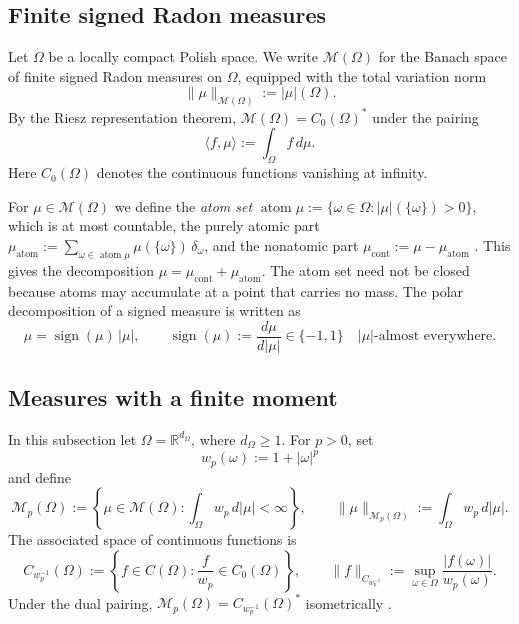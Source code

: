\documentclass[11pt]{amsart}
\theoremstyle{definition}
\theoremstyle{remark}
\DeclareMathOperator{\atom}{atom}
\DeclareMathOperator{\cont}{cont}
\DeclareMathOperator{\sign}{sign}
\begin{document}
\subsection{Finite signed Radon measures}
Let $\Omega$ be a locally compact Polish space. We write
$\mathcal M(\Omega)$ for the Banach space of finite signed Radon measures on
$\Omega$, equipped with the total variation norm
\begin{equation*}
	\|\mu\|_{\mathcal M(\Omega)}:=|\mu|(\Omega).
\end{equation*}
By the Riesz representation theorem,
$\mathcal M(\Omega)=C_0(\Omega)^*$ under the pairing
\begin{equation*}
	\langle f,\mu\rangle:=\int_\Omega f\,d\mu.
\end{equation*}
Here $C_0(\Omega)$ denotes the continuous functions vanishing at infinity.

For $\mu \in \mathcal{M}(\Omega)$ we define the \emph{atom set}
$\atom \mu := \{\omega \in \Omega : |\mu|(\{\omega\}) > 0\}$, which is at most
countable, the purely atomic part
$\mu_{\atom} := \sum_{\omega \in \atom\mu} \mu(\{\omega\})\, \delta_\omega$,
and the nonatomic part $\mu_{\cont} := \mu - \mu_{\atom}$
\cite{bouchitte1990new}. This gives the decomposition
$\mu=\mu_{\cont}+\mu_{\atom}$.
The atom set need not be closed because atoms may accumulate at a point that
carries no mass.
The polar decomposition of a signed measure is written as
\begin{equation*}
	\mu=\sign(\mu)\,|\mu|,
	\qquad
	\sign(\mu):=\frac{d\mu}{d|\mu|}\in\{-1,1\}
	\quad |\mu|\text{-almost everywhere}.
\end{equation*}

\subsection{Measures with a finite moment}
In this subsection let $\Omega=\mathbb R^{d_\Omega}$, where
$d_\Omega\ge1$. For $p>0$, set
\begin{equation*}
	w_p(\omega):=1+|\omega|^p
\end{equation*}
and define
\begin{equation}
\label{eq:moment-space}
	\mathcal M_p(\Omega):=
	\left\{\mu\in\mathcal M(\Omega):
	\int_\Omega w_p\,d|\mu|<\infty\right\},
	\qquad
	\|\mu\|_{\mathcal M_p(\Omega)}:=
	\int_\Omega w_p\,d|\mu|.
\end{equation}
The associated space of continuous functions is
\begin{equation*}
	C_{w_p^{-1}}(\Omega):=
	\left\{f\in C(\Omega):\frac{f}{w_p}\in C_0(\Omega)\right\},
	\qquad
	\|f\|_{C_{w_p^{-1}}}:=
	\sup_{\omega\in\Omega}\frac{|f(\omega)|}{w_p(\omega)}.
\end{equation*}
Under the dual pairing,
$\mathcal M_p(\Omega)=C_{w_p^{-1}}(\Omega)^*$ isometrically
\cite[Section~5]{bartolucci-et-al}. 
\end{document}
